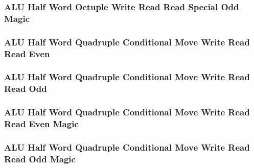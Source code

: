 

\subsubsection[{\small ALU Half Word Octuple Write Read Read Special Odd Magic}]{ALU Half Word Octuple Write Read Read Special Odd Magic} \label{sec:format-ALU-HQWRRSO.M}



\subsubsection[{\small ALU Half Word Quadruple Conditional Move Write Read Read Even}]{ALU Half Word Quadruple Conditional Move Write Read Read Even} \label{sec:format-ALU-HQCMWRRE}



\subsubsection[{\small ALU Half Word Quadruple Conditional Move Write Read Read Odd}]{ALU Half Word Quadruple Conditional Move Write Read Read Odd} \label{sec:format-ALU-HQCMWRRO}



\subsubsection[{\small ALU Half Word Quadruple Conditional Move Write Read Read Even Magic}]{ALU Half Word Quadruple Conditional Move Write Read Read Even Magic} \label{sec:format-ALU-HQCMWRRE.M}



\subsubsection[{\small ALU Half Word Quadruple Conditional Move Write Read Read Odd Magic}]{ALU Half Word Quadruple Conditional Move Write Read Read Odd Magic} \label{sec:format-ALU-HQCMWRRO.M}

